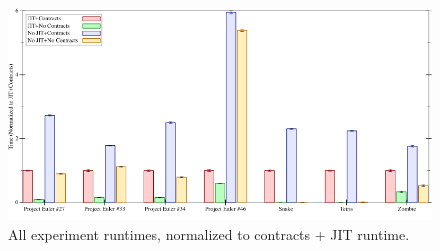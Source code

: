 \begin{figure}[t]
  \begin{center}
  \hspace*{-1.5cm}\includegraphics[width=15cm]{data/normalized-runtimes.png}
  \caption{All experiment runtimes, normalized to contracts + JIT runtime.}
  \label{fig:runtimes}
  \end{center}
\end{figure}